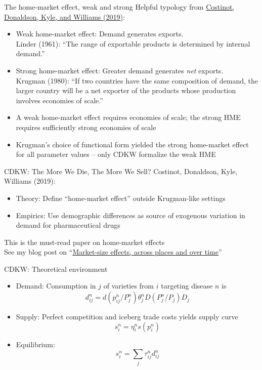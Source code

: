\documentclass[11pt,notes=hide,aspectratio=169]{beamer}
\begin{document}
\begin{frame}{The home-market effect, weak and strong}
Helpful typology from \href{https://academic.oup.com/qje/article/134/2/843/5298504}{Costinot, Donaldson, Kyle, and Williams (2019)}:
\begin{itemize}
	\item Weak home-market effect: Demand generates exports.\\Linder (1961): ``The range of exportable products is determined by internal demand.''
	\item Strong home-market effect: Greater demand generates \textit{net} exports.\\ Krugman (1980): ``If two countries have the same composition of demand, the larger country will be a net exporter of the products whose production involves economies of scale.''
	\item A weak home-market effect requires economies of scale; the strong HME requires sufficiently strong economies of scale
	\item Krugman's choice of functional form yielded the strong home-market effect for all parameter values -- only CDKW formalize the weak HME
\end{itemize}
\end{frame}
\begin{frame}{CDKW: The More We Die, The More We Sell?}
Costinot, Donaldson, Kyle, Williams (2019):
\begin{itemize}
	\item Theory: Define ``home-market effect'' outside Krugman-like settings
	\item Empirics: Use demographic differences as source of exogenous variation in demand for pharmaceutical drugs
\end{itemize}
This is the must-read paper on home-market effects\\
\vspace{5mm}
\footnotesize{See my blog post on ``\href{https://tradediversion.net/2019/09/23/market-size-effects-across-places-and-over-time/}{Market-size effects, across places and over time}''}
\end{frame}
\begin{frame}{CDKW: Theoretical environment}
\begin{itemize}
	\item Demand: Consumption in $j$ of varieties from $i$ targeting disease $n$ is
	\begin{equation*}d_{ij}^n = d(p_{ij}^n/P_j^n) \theta_j^n D(P_j^n/P_j) D_j \end{equation*}
	\item Supply: Perfect competition and iceberg trade costs yields supply curve
	\begin{equation*} s_i^n = \eta_i^n s(p_i^n)\end{equation*}
	\item Equilibrium: 
	\begin{equation*} s_i^n = \sum_j \tau_{ij}^n d_{ij}^n \end{equation*}
\end{itemize}
\end{frame}
\end{document}
